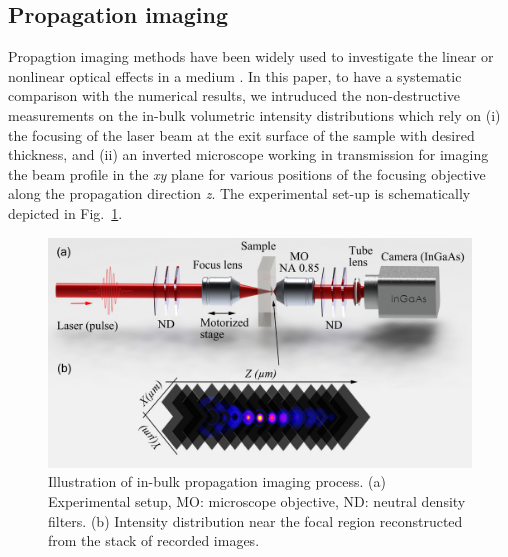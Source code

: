 \documentclass[9pt,twocolumn,twoside]{osajnl}
\begin{document}
\subsection{ Propagation imaging}
Propagtion imaging methods have been widely used to investigate the linear or nonlinear optical effects in a medium \cite{pasquier2015handling, wang2020ultrafast,Chambonneau2020}. In this paper, to have a systematic comparison with the numerical results, we intruduced the non-destructive measurements on the in-bulk volumetric intensity distributions which rely on (i) the focusing of the laser beam at the exit surface of the sample with desired thickness, and (ii) an inverted microscope working in transmission for imaging the beam profile in the \textit{xy} plane for various positions of the focusing objective along the propagation direction \textit{z}. The experimental set-up is schematically depicted in Fig.~\ref{fig:2}.
\begin{figure}
	\centering
	\includegraphics[width=\linewidth]{../AppOptics/figures/setup.pdf}
	\caption{Illustration of in-bulk propagation imaging process. (a) Experimental setup, MO: microscope objective, ND: neutral density filters. (b) Intensity distribution near the focal region reconstructed from the stack of recorded images.}\label{fig:2}
\end{figure}
\end{document}
